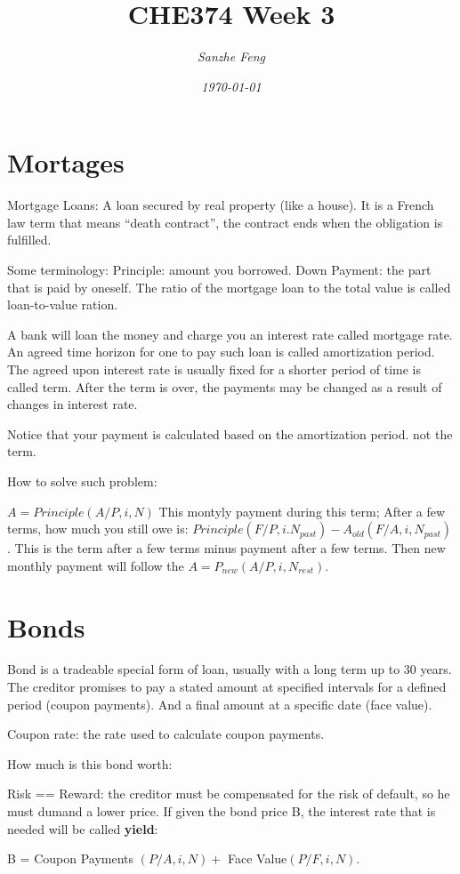 \documentclass{article}
\begin{document}
\begin{titlepage}
\title{\textbf{CHE374 Week 3}}
\author{\textit{Sanzhe Feng}}
\date{\textit{\today}}
\maketitle
\end{titlepage}
\setlength{\parindent}{0pt}

\section*{Mortages}
Mortgage Loans: A loan secured by real property (like a house). It is a French law term that means ``death contract'', the contract ends when the obligation is fulfilled. 

Some terminology: Principle: amount you borrowed. Down Payment: the part that is paid by oneself. The ratio of the mortgage loan to the total value is called loan-to-value ration.

A bank will loan the money and charge you an interest rate called mortgage rate. An agreed time horizon for one to pay such loan is called amortization period. The agreed upon interest rate is usually fixed for a shorter period of time is called term. After the term is over, the payments may be changed as a result of changes in interest rate. 

Notice that your payment is calculated based on the amortization period. not the term.

How to solve such problem: 

$A = Principle(A/P, i, N)$ This montyly payment during this term; After a few terms, how much you still owe is: $Principle (F/P, i. N_{past}) - A_{old}(F/A, i, N_{past})$. This is the term after a few terms minus payment after a few terms. Then new monthly payment will follow the $A = P_{new}(A/P, i, N_{rest})$. 

\section*{Bonds}

Bond is a tradeable special form of loan, usually with a long term up to 30 years. The creditor promises to pay a stated amount at specified intervals for a defined period (coupon payments). And a final amount at a specific date (face value).

Coupon rate: the rate used to calculate coupon payments.

How much is this bond worth: 

Risk == Reward: the creditor must be compensated for the risk of default, so he must dumand a lower price. If given the bond price B, the interest rate that is needed will be called \textbf{yield}:

B = Coupon Payments $(P/A, i, N) +$ Face Value$(P/F, i, N)$.
\end{document}
